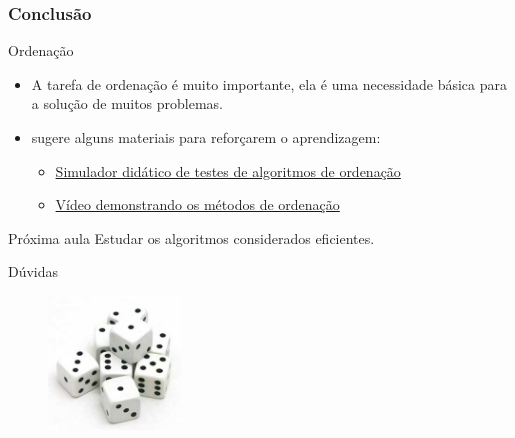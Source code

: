 \documentclass[aspectratio=169]{beamer}
\begin{document}
\begin{frame}
\frametitle{Conclusão}
\begin{block}{Ordenação}
  \begin{itemize}
   \item A tarefa de ordenação é muito importante, ela é uma necessidade básica para a solução de muitos problemas.
   \item {} sugere alguns materiais para reforçarem o aprendizagem:
      \begin{itemize}
       \item \href{http://www.inf.ufrgs.br/~bsguedes/simulador/}{Simulador didático de testes de algoritmos de ordenação}
       \item \href{http://www.youtube.com/watch?v=YKlDz1J3TSw}{Vídeo demonstrando os métodos de ordenação}
      \end{itemize}

  \end{itemize}  
\end{block}
\begin{block}{Próxima aula}
  Estudar os algoritmos considerados eficientes.
\end{block}
\end{frame}


\begin{frame}
\Huge{\centerline{Dúvidas}}

\begin{figure}[!h]
  \centering
  \includegraphics[width=100pt]{imgs/dados.jpg}
  \label{fig_fim}
\end{figure}
\end{frame}
\end{document}
